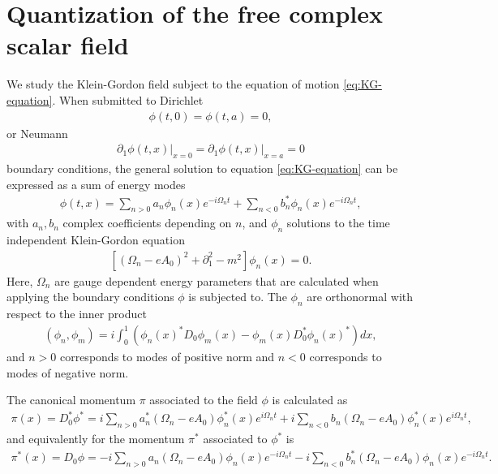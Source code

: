 \section{Quantization of the free complex scalar field}
\label{sec:quantization}

We study the Klein-Gordon field subject to the equation of motion \eqref{eq:KG-equation}.
When submitted to Dirichlet 
\begin{align}
    \phi(t, 0) = \phi(t, a) = 0,
\end{align}
or  Neumann 
\begin{align}
   \left. \partial_1 \phi(t, x)  \right|_{x=0}
   =\left. \partial_1 \phi(t, x)  \right|_{x=a} = 0
\end{align}
boundary conditions,
the general solution to equation \eqref{eq:KG-equation} can be expressed as a sum of energy modes
\begin{align}
	\phi(t, x) = \sum_{n>0}^{} a_n \phi_n (x) e^{-i\Omega_n t}
+\sum_{n<0}^{} b^*_n \phi_n (x) e^{-i\Omega_n t},
\label{eq:field-expansion}
\end{align}
with $a_n, b_n$ complex coefficients depending on $n $, and $\phi_n$ solutions to the time independent Klein-Gordon equation
\begin{align}
	\left[ \left( \Omega_n - eA_0 \right)^2 + \partial_1^2 - m^2  \right] \phi_n(x) = 0.
    \label{eq:TIKGE1}
\end{align}
Here, $\Omega_n$ are gauge dependent energy parameters that are calculated when applying the boundary conditions $\phi$ is subjected to. The $\phi_n$ are orthonormal with respect to the inner product 
\begin{align}
	(\phi_n, \phi_m) = i\int_{0}^{1} \left(  \phi_n(x)^*D_0\phi_m(x) -  \phi_m(x)D_0^*\phi_n(x)^* \right) dx,
\end{align}
and $n>0$ corresponds to modes of positive norm and $n<0$ corresponds to modes of negative norm.

The canonical momentum $\pi$ associated to the field $\phi$ is calculated as
\begin{align}
	\pi(x) = D_0^*\phi^*= i\sum_{n>0}^{} a^*_n(\Omega_n - eA_0)\phi_n^*(x) e^{i\Omega_n t}
+ i\sum_{n<0}^{} b_n(\Omega_n - eA_0)\phi_n^*(x) e^{i\Omega_n t},
\end{align}
and equivalently for the momentum $\pi^*$ associated to $\phi^*$ is  
\begin{align}
	\pi^*(x) = D_0\phi= -i\sum_{n>0}^{} a_n(\Omega_n - eA_0)\phi_n(x) e^{-i\Omega_n t}
- i\sum_{n<0}^{} b_n^*(\Omega_n - eA_0)\phi_n(x) e^{-i\Omega_n t}.
\end{align}

